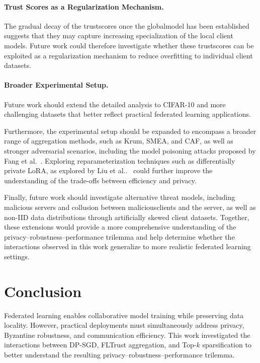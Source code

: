 \documentclass[11pt,twocolumn,a4paper,DIV=calc,parskip=half]{scrartcl}
\begin{document}
	\paragraph{Trust Scores as a Regularization Mechanism.}
	The gradual decay of the \glspl{trustscore} once the \gls{globalmodel} has been established suggests that they may capture increasing specialization of the local client models. Future work could therefore investigate whether these \glspl{trustscore} can be exploited as a regularization mechanism to reduce overfitting to individual client datasets.
	
	\paragraph{Broader Experimental Setup.}
	Future work should extend the detailed analysis to CIFAR-10 and more challenging datasets that better reflect practical federated learning applications.
	
	Furthermore, the experimental setup should be expanded to encompass a broader range of aggregation methods, such as Krum, SMEA, and CAF, as well as stronger adversarial scenarios, including the model poisoning attacks proposed by Fang et al.~\cite{fang2020poisoning}. Exploring reparameterization techniques such as differentially private LoRA, as explored by Liu et al..~\cite{liu2025dplora} could further improve the understanding of the trade-offs between efficiency and privacy.
	
	Finally, future work should investigate alternative threat models, including malicious servers and collusion between \glspl{maliciousclient} and the server, as well as non-\ac{IID} data distributions through artificially skewed client datasets. Together, these extensions would provide a more comprehensive understanding of the privacy--robustness--performance trilemma and help determine whether the interactions observed in this work generalize to more realistic federated learning settings.
	
	
	\section{Conclusion}
	\label{sec:conclusion}
	
	Federated learning enables collaborative model training while preserving data locality. However, practical deployments must simultaneously address privacy, Byzantine robustness, and communication efficiency. This work investigated the interactions between \ac{DP-SGD}, FLTrust aggregation, and Top-$k$ sparsification to better understand the resulting privacy–robustness–performance trilemma.
	
\end{document}

